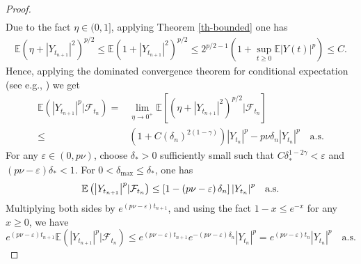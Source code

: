 \documentclass[preprint,12pt,compress]{elsarticle}
\begin{document}
\begin{proof}
\begin{equation}
\begin{split}
\end{split}
\end{equation}
Due to the fact $\eta \in (0, 1]$, applying Theorem \ref{th-bounded} one has 
\begin{equation*}
	\begin{split}
		\mathbb{E}{\left( {\eta  + {{\left| {{Y_{{t_{n + 1}}}}} \right|}^2}} \right)^{p/2}} \le \mathbb{E}{\left( {1 + {{\left| {{Y_{{t_{n + 1}}}}} \right|}^2}} \right)^{p/2}} \le {2^{p/2 - 1}}\left( {1 + \mathop {\sup }\limits_{t \ge 0} \mathbb{E}{{\left| {Y(t)} \right|}^p}} \right) \le C .
	\end{split}
\end{equation*}
Hence, applying the dominated convergence theorem for conditional expectation (see e.g., \cite[p. 218]{shiryaev2019probability}) we get
\begin{equation*}
\begin{split}
	\mathbb{E}\left( {{{\left| {{Y_{{t_{n + 1}}}}} \right|}^p}|{\mathcal{F}_{{t_n}}}} \right) =& \mathop {\lim }\limits_{\eta  \to {0^ + }} \mathbb{E}\left[ {{{\left( {\eta  + {{\left| {{Y_{{t_{n + 1}}}}} \right|}^2}} \right)}^{p/2}}|{\mathcal{F}_{{t_n}}}} \right] \\
	\le& \left( {1 + C{{\left( {\delta _n } \right)}^{2(1 - \gamma )}}} \right){\left| {{Y_{{t_n}}}} \right|^p} - {p\nu }\delta _n {\left| {{Y_{{t_n}}}} \right|^p} \quad \text{a.s.}
\end{split}
\end{equation*}
For any $\varepsilon  \in (0,p\nu )$, choose $\delta_* > 0$ sufficiently small such that $C\delta _*^{1 - 2\gamma } < \varepsilon $ and $(p\nu - \varepsilon)\delta_* < 1$. For $0 < \delta_{\max} \le \delta_*$, one has
\begin{equation*}
\begin{split}
	\mathbb{E}\left( {{{\left| {{Y_{{t_{n + 1}}}}} \right|}^p}|{{\cal F}_{{t_n}}}} \right) \le \left[ {1 - \left( {p\nu  - \varepsilon } \right)\delta _n } \right]{\left| {{Y_{{t_n}}}} \right|^p} \quad \text{a.s.}
\end{split}
\end{equation*}
Multiplying both sides by ${e^{\left( {{p\nu } - \varepsilon } \right){t_{n + 1}}}}$, and using the fact $ 1 - x \le e^{-x}$ for any $x \ge 0$, we have
\begin{equation*} 
	{e^{\left( {{p\nu } - \varepsilon } \right){t_{n + 1}}}}\mathbb{E}\left( {{{\left| {{Y_{{t_{n + 1}}}}} \right|}^p}|{\mathcal{F}_{{t_n}}}} \right) \le {e^{\left( {{p\nu } - \varepsilon } \right){t_{n + 1}}}}{e^{ - \left( {{p\nu } - \varepsilon } \right)\delta _n }}{\left| {{Y_{{t_n}}}} \right|^p} = {e^{\left( {{p\nu } - \varepsilon } \right){t_n}}}{\left| {{Y_{{t_n}}}} \right|^p} \quad \text{a.s.}

\end{equation*}
\end{proof}
\end{document}
